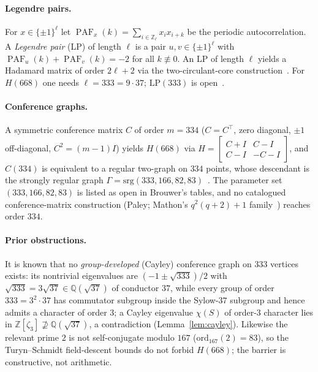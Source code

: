 \documentclass[11pt]{article}
\theoremstyle{definition}
\DeclareMathOperator{\PAF}{PAF}
\newcommand{\Z}{\mathbb{Z}}
\newcommand{\Q}{\mathbb{Q}}
\begin{document}
\paragraph{Legendre pairs.} For $x\in\{\pm1\}^\ell$ let $\PAF_x(k)=\sum_{i\in\Z_\ell} x_i x_{i+k}$ be
the periodic autocorrelation. A \emph{Legendre pair} (LP) of length $\ell$ is a pair $u,v\in\{\pm1\}^\ell$
with $\PAF_u(k)+\PAF_v(k)=-2$ for all $k\not\equiv 0$. An LP of length $\ell$ yields a Hadamard matrix
of order $2\ell+2$ via the two-circulant-core construction~\cite{fgs}. For $H(668)$ one needs
$\ell=333=9\cdot 37$; $\mathrm{LP}(333)$ is open~\cite{kk-mod3,balonin}.

\paragraph{Conference graphs.} A symmetric conference matrix $C$ of order $m=334$ ($C=C^\top$, zero
diagonal, $\pm1$ off-diagonal, $C^2=(m-1)I$) yields $H(668)$ via
$H=\left[\begin{smallmatrix}C+I & C-I\\ C-I & -C-I\end{smallmatrix}\right]$, and $C(334)$ is equivalent to
a regular two-graph on $334$ points, whose descendant is the strongly regular graph
$\Gamma=\mathrm{srg}(333,166,82,83)$~\cite{seidel,brouwer}. The parameter set $(333,166,82,83)$ is listed
as open in Brouwer's tables, and no catalogued conference-matrix construction (Paley; Mathon's
$q^2(q+2)+1$ family~\cite{mathon}) reaches order $334$.

\paragraph{Prior obstructions.} It is known that no \emph{group-developed} (Cayley) conference graph on
$333$ vertices exists: its nontrivial eigenvalues are $(-1\pm\sqrt{333})/2$ with $\sqrt{333}=3\sqrt{37}\in
\Q(\sqrt{37})$ of conductor $37$, while every group of order $333=3^2\cdot 37$ has commutator subgroup
inside the Sylow-$37$ subgroup and hence admits a character of order $3$; a Cayley eigenvalue $\chi(S)$
of order-$3$ character lies in $\Z[\zeta_3]\not\supseteq\Q(\sqrt{37})$, a contradiction
(Lemma~\ref{lem:cayley}). Likewise the relevant prime $2$ is not self-conjugate modulo $167$
($\mathrm{ord}_{167}(2)=83$), so the Turyn--Schmidt field-descent bounds do not forbid $H(668)$; the
barrier is constructive, not arithmetic.
\end{document}

